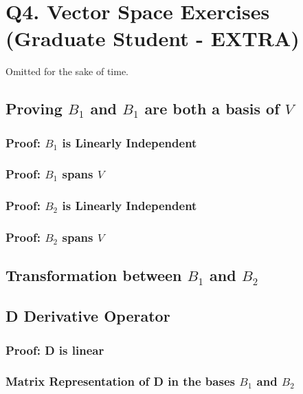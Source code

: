 \documentclass{article}
\begin{document}
    \section{Q4. Vector Space Exercises (Graduate Student - EXTRA)}

    Omitted for the sake of time. 

    \subsection{Proving $B_1$ and $B_1$ are both a basis of $V$}

    \subsubsection{Proof: $B_1$ is Linearly Independent}

    \subsubsection{Proof: $B_1$ spans $V$}

    \subsubsection{Proof: $B_2$ is Linearly Independent}

    \subsubsection{Proof: $B_2$ spans $V$}

    \subsection{Transformation between $B_1$ and $B_2$}

    \subsection{D Derivative Operator}

    \subsubsection{Proof: D is linear}

    \subsubsection{Matrix Representation of D in the bases $B_1$ and $B_2$}
\end{document}
